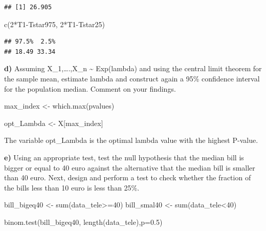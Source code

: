 \documentclass[
]{article}
\newenvironment{Shaded}{\begin{snugshade}}{\end{snugshade}}
\newcommand{\AttributeTok}[1]{\textcolor[rgb]{0.77,0.63,0.00}{#1}}
\newcommand{\DecValTok}[1]{\textcolor[rgb]{0.00,0.00,0.81}{#1}}
\newcommand{\FloatTok}[1]{\textcolor[rgb]{0.00,0.00,0.81}{#1}}
\newcommand{\FunctionTok}[1]{\textcolor[rgb]{0.00,0.00,0.00}{#1}}
\newcommand{\NormalTok}[1]{#1}
\newcommand{\OtherTok}[1]{\textcolor[rgb]{0.56,0.35,0.01}{#1}}
\newcommand{\SpecialCharTok}[1]{\textcolor[rgb]{0.00,0.00,0.00}{#1}}
\begin{document}
\begin{verbatim}
## [1] 26.905
\end{verbatim}

\begin{Shaded}
\begin{Highlighting}[]
\FunctionTok{c}\NormalTok{(}\DecValTok{2}\SpecialCharTok{*}\NormalTok{T1}\SpecialCharTok{{-}}\NormalTok{Tstar975, }\DecValTok{2}\SpecialCharTok{*}\NormalTok{T1}\SpecialCharTok{{-}}\NormalTok{Tstar25)}
\end{Highlighting}
\end{Shaded}

\begin{verbatim}
## 97.5%  2.5% 
## 18.49 33.34
\end{verbatim}

\textbf{d)} Assuming X\_1,\ldots.,X\_n \textasciitilde{} Exp(lambda) and
using the central limit theorem for the sample mean, estimate lambda and
construct again a 95\% confidence interval for the population median.
Comment on your findings.

\begin{Shaded}
\begin{Highlighting}[]
\NormalTok{max\_index }\OtherTok{\textless{}{-}} \FunctionTok{which.max}\NormalTok{(pvalues)}

\NormalTok{opt\_Lambda }\OtherTok{\textless{}{-}}\NormalTok{ X[max\_index]}
\end{Highlighting}
\end{Shaded}

The variable opt\_Lambda is the optimal lambda value with the highest
P-value.

\textbf{e)} Using an appropriate test, test the null hypothesis that the
median bill is bigger or equal to 40 euro against the alternative that
the median bill is smaller than 40 euro. Next, design and perform a test
to check whether the fraction of the bills less than 10 euro is less
than 25\%.

\begin{Shaded}
\begin{Highlighting}[]
\NormalTok{bill\_bigeq40 }\OtherTok{\textless{}{-}} \FunctionTok{sum}\NormalTok{(data\_tele}\SpecialCharTok{\textgreater{}=}\DecValTok{40}\NormalTok{)}
\NormalTok{bill\_smal40 }\OtherTok{\textless{}{-}} \FunctionTok{sum}\NormalTok{(data\_tele}\SpecialCharTok{\textless{}}\DecValTok{40}\NormalTok{)}

\FunctionTok{binom.test}\NormalTok{(bill\_bigeq40, }\FunctionTok{length}\NormalTok{(data\_tele),}\AttributeTok{p=}\FloatTok{0.5}\NormalTok{)}
\end{Highlighting}
\end{Shaded}
\end{document}
